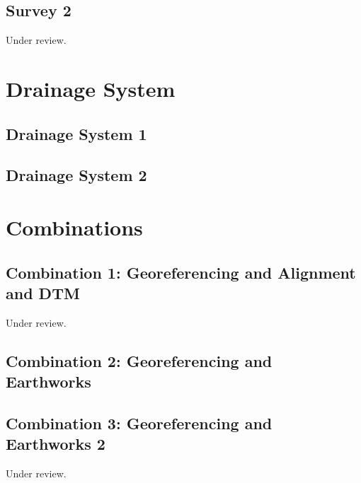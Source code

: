 \documentclass{scrartcl}
\begin{document}
\subsection{Survey 2}
\label{sec:survey_2}
Under review.%
\clearpage


\section{Drainage System}

\subsection{Drainage System 1}
\label{sec:drainage_1}
\clearpage

\subsection{Drainage System 2}
\label{sec:drainage_2}
\clearpage

\section{Combinations}

\subsection{Combination 1: Georeferencing and Alignment and DTM}
\label{sec:align_dtm_1}
Under review.%
\clearpage

\subsection{Combination 2: Georeferencing and Earthworks}
\label{sec:georef_earth_1}
\clearpage

\subsection{Combination 3: Georeferencing and Earthworks 2}
\label{sec:georef_earth_2}
Under review.%
\clearpage
\end{document}

